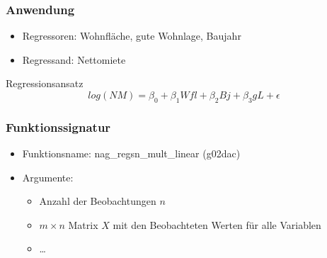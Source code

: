 \documentclass{beamer}
\begin{document}
\begin{frame}
  \frametitle{Anwendung}
  

  \begin{itemize}
  \item Regressoren: Wohnfläche, gute Wohnlage, Baujahr
  \item Regressand: Nettomiete
  \end{itemize}

  \begin{block}{Regressionsansatz}
    \begin{equation*}
      log(NM) = \beta_0 + \beta_1 Wfl + \beta_2 Bj + \beta_3 gL + \epsilon
    \end{equation*}
  \end{block}


\end{frame}

\begin{frame}
  \frametitle{Funktionssignatur}
  
  \begin{itemize}
  \item Funktionsname: nag\_regsn\_mult\_linear (g02dac)
  \item Argumente:
    \begin{itemize}
    \item Anzahl der Beobachtungen $n$
    \item $m \times n$ Matrix $X$ mit den Beobachteten Werten für alle Variablen
    \item \dots
    \end{itemize}
  \end{itemize}

\end{frame}
\end{document}

